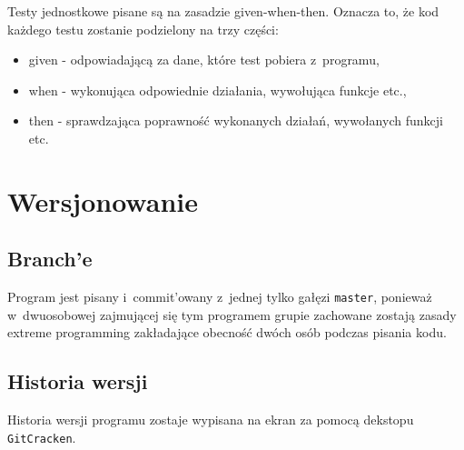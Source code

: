 \documentclass[a4paper,12pt,oneside]{article}
\begin{document}
\par
Testy jednostkowe pisane są na zasadzie given-when-then. Oznacza to, że kod każdego testu zostanie podzielony na trzy części:
\begin{itemize}
\item given - odpowiadającą za dane, które test pobiera z~programu,
\item when - wykonująca odpowiednie działania, wywołująca funkcje etc.,
\item then - sprawdzająca poprawność wykonanych działań, wywołanych funkcji etc.
\end{itemize}

\section{Wersjonowanie}

\subsection{Branch'e}
Program jest pisany i~commit'owany z~jednej tylko gałęzi \verb+master+, ponieważ w~dwuosobowej zajmującej się tym programem grupie zachowane zostają zasady extreme programming zakładające obecność dwóch osób podczas pisania kodu.

\subsection{Historia wersji}
Historia wersji programu zostaje wypisana na ekran za pomocą dekstopu \verb+GitCracken+.
\end{document}
